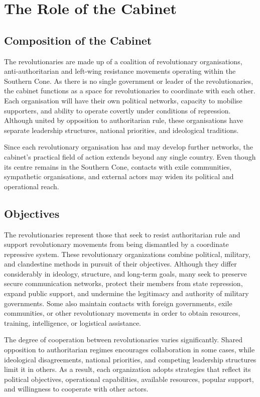 \section{The Role of the Cabinet}

\subsection{Composition of the Cabinet}

The revolutionaries are made up of a coalition of revolutionary organisations, anti-authoritarian and left-wing resistance movements operating within the Southern Cone. As there is no single government or leader of the revolutionaries, the cabinet functions as a space for revolutionaries to coordinate with each other. Each organisation will have their own political networks, capacity to mobilise supporters, and ability to operate covertly under conditions of repression. Although united by opposition to authoritarian rule, these organisations have separate leadership structures, national priorities, and ideological traditions.

Since each revolutionary organisation has and may develop further networks, the cabinet’s practical field of action extends beyond any single country. Even though its centre remains in the Southern Cone, contacts with exile communities, sympathetic organisations, and external actors may widen its political and operational reach.

\subsection{Objectives}

The revolutionaries represent those that seek to resist authoritarian rule and support revolutionary movements from being dismantled by a coordinate repressive system. These revolutionary organizations combine political, military, and clandestine methods in pursuit of their objectives. Although they differ considerably in ideology, structure, and long-term goals, many seek to preserve secure communication networks, protect their members from state repression, expand public support, and undermine the legitimacy and authority of military governments. Some also maintain contacts with foreign governments, exile communities, or other revolutionary movements in order to obtain resources, training, intelligence, or logistical assistance.

The degree of cooperation between revolutionaries varies significantly. Shared opposition to authoritarian regimes encourages collaboration in some cases, while ideological disagreements, national priorities, and competing leadership structures limit it in others. As a result, each organization adopts strategies that reflect its political objectives, operational capabilities, available resources, popular support, and willingness to cooperate with other actors.

